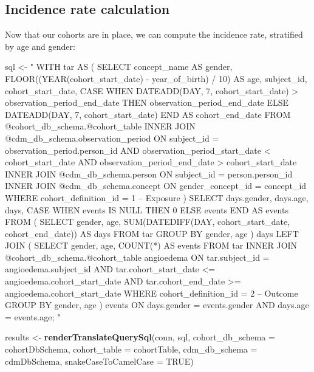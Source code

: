 \documentclass[11pt]{book}
\newenvironment{Shaded}{\begin{snugshade}}{\end{snugshade}}
\newcommand{\DataTypeTok}[1]{\textcolor[rgb]{0.13,0.29,0.53}{#1}}
\newcommand{\KeywordTok}[1]{\textcolor[rgb]{0.13,0.29,0.53}{\textbf{#1}}}
\newcommand{\NormalTok}[1]{#1}
\newcommand{\OtherTok}[1]{\textcolor[rgb]{0.56,0.35,0.01}{#1}}
\newcommand{\StringTok}[1]{\textcolor[rgb]{0.31,0.60,0.02}{#1}}
\theoremstyle{definition}
\theoremstyle{definition}
\theoremstyle{definition}
\theoremstyle{remark}
\begin{document}
\hypertarget{incidence-rate-calculation}{%
\subsection{Incidence rate calculation}\label{incidence-rate-calculation}}

Now that our cohorts are in place, we can compute the incidence rate, stratified by age and gender:

\begin{Shaded}
\begin{Highlighting}[]
\NormalTok{sql <-}\StringTok{ "}
\StringTok{WITH tar AS (}
\StringTok{  SELECT concept_name AS gender,}
\StringTok{    FLOOR((YEAR(cohort_start_date) -}
\StringTok{          year_of_birth) / 10) AS age,}
\StringTok{    subject_id,}
\StringTok{    cohort_start_date,}
\StringTok{    CASE WHEN DATEADD(DAY, 7, cohort_start_date) >}
\StringTok{      observation_period_end_date}
\StringTok{    THEN observation_period_end_date}
\StringTok{    ELSE DATEADD(DAY, 7, cohort_start_date)}
\StringTok{    END AS cohort_end_date}
\StringTok{  FROM @cohort_db_schema.@cohort_table}
\StringTok{  INNER JOIN @cdm_db_schema.observation_period}
\StringTok{    ON subject_id = observation_period.person_id}
\StringTok{      AND observation_period_start_date < cohort_start_date}
\StringTok{      AND observation_period_end_date > cohort_start_date}
\StringTok{  INNER JOIN @cdm_db_schema.person}
\StringTok{    ON subject_id = person.person_id}
\StringTok{  INNER JOIN @cdm_db_schema.concept}
\StringTok{    ON gender_concept_id = concept_id}
\StringTok{  WHERE cohort_definition_id = 1 -- Exposure}
\StringTok{)}
\StringTok{SELECT days.gender,}
\StringTok{    days.age,}
\StringTok{    days,}
\StringTok{    CASE WHEN events IS NULL THEN 0 ELSE events END AS events}
\StringTok{FROM (}
\StringTok{  SELECT gender,}
\StringTok{    age,}
\StringTok{    SUM(DATEDIFF(DAY, cohort_start_date,}
\StringTok{      cohort_end_date)) AS days}
\StringTok{  FROM tar}
\StringTok{  GROUP BY gender,}
\StringTok{    age}
\StringTok{) days}
\StringTok{LEFT JOIN (}
\StringTok{  SELECT gender,}
\StringTok{      age,}
\StringTok{      COUNT(*) AS events}
\StringTok{  FROM tar}
\StringTok{  INNER JOIN @cohort_db_schema.@cohort_table angioedema}
\StringTok{    ON tar.subject_id = angioedema.subject_id}
\StringTok{      AND tar.cohort_start_date <= angioedema.cohort_start_date}
\StringTok{      AND tar.cohort_end_date >= angioedema.cohort_start_date}
\StringTok{  WHERE cohort_definition_id = 2 -- Outcome}
\StringTok{  GROUP BY gender,}
\StringTok{    age}
\StringTok{) events}
\StringTok{ON days.gender = events.gender}
\StringTok{  AND days.age = events.age;}
\StringTok{"}

\NormalTok{results <-}\StringTok{ }\KeywordTok{renderTranslateQuerySql}\NormalTok{(conn, sql,}
                                   \DataTypeTok{cohort_db_schema =}\NormalTok{ cohortDbSchema,}
                                   \DataTypeTok{cohort_table =}\NormalTok{ cohortTable,}
                                   \DataTypeTok{cdm_db_schema =}\NormalTok{ cdmDbSchema,}
                                   \DataTypeTok{snakeCaseToCamelCase =} \OtherTok{TRUE}\NormalTok{)}
\end{Highlighting}
\end{Shaded}
\end{document}

